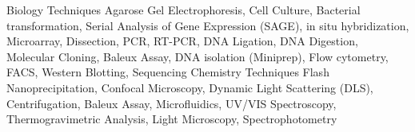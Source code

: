 \begin{cvskills}
  \cvskill
    {Biology Techniques} %
    {Agarose Gel Electrophoresis, Cell Culture, Bacterial transformation, Serial Analysis of Gene Expression (SAGE), in situ hybridization, Microarray, Dissection, PCR, RT-PCR, DNA Ligation, DNA Digestion, Molecular Cloning, Baleux Assay, DNA isolation (Miniprep), Flow cytometry, FACS, Western Blotting, Sequencing} %
  \cvskill
    {Chemistry Techniques} %
    {Flash Nanoprecipitation, Confocal Microscopy, Dynamic Light Scattering (DLS), Centrifugation, Baleux Assay, Microfluidics, UV/VIS Spectroscopy, Thermogravimetric Analysis, Light Microscopy, Spectrophotometry} %
\end{cvskills}